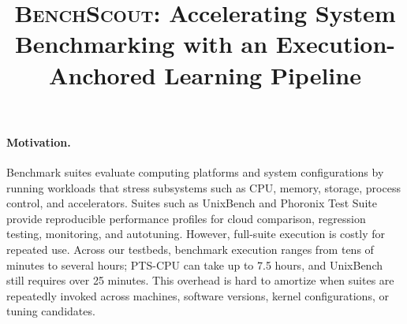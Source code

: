 \documentclass[sigplan,10pt, anonymous]{acmart}
\newcommand{\ourmethod}{\textsc{BenchScout}\xspace}
\begin{document}
\title[\ourmethod]{\ourmethod: Accelerating System Benchmarking with an Execution-Anchored Learning Pipeline}



\renewcommand{\shortauthors}{Trovato et al.}






\maketitle



\paragraph{Motivation.}
Benchmark suites evaluate computing platforms and system configurations by running workloads that stress subsystems such as CPU, memory, storage, process control, and accelerators.
Suites such as UnixBench and Phoronix Test Suite provide reproducible performance profiles for cloud comparison, regression testing, monitoring, and autotuning.
However, full-suite execution is costly for repeated use.
Across our testbeds, benchmark execution ranges from tens of minutes to several hours; PTS-CPU can take up to 7.5 hours, and UnixBench still requires over 25 minutes.
This overhead is hard to amortize when suites are repeatedly invoked across machines, software versions, kernel configurations, or tuning candidates.
\end{document}
